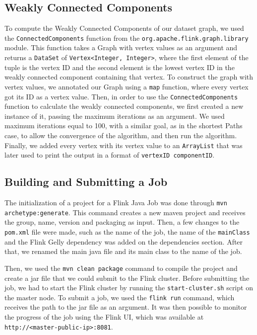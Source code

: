 \documentclass[conference]{IEEEtran}
\begin{document}
\subsection{Weakly Connected Components}

To compute the Weakly Connected Components of our dataset graph, we used the \verb|ConnectedComponents| function from the \verb|org.apache.flink.graph.library| module. This function takes a Graph with vertex values as an argument and returns a \verb|DataSet| of \verb|Vertex<Integer, Integer>|, where the first element of the tuple is the vertex ID and the second element is the lowest vertex ID in the weakly connected component containing that vertex. To construct the graph with vertex values, we annotated our Graph using a \verb|map| function, where every vertex got its ID as a vertex value. Then, in order to use the \verb|ConnectedComponents| function to calculate the weakly connected components, we first created a new instance of it, passing the maximum iterations as an argument. We used maximum iterations equal to 100, with a similar goal, as in the shortest Paths case, to allow the convergence of the algorithm, and then run the algorithm. Finally, we added every vertex with its vertex value to an \verb|ArrayList| that was later used to print the output in a format of \verb|vertexID componentID|.

\subsection{Building and Submitting a Job}

The initialization of a project for a Flink Java Job was done through \verb|mvn archetype:generate|. This command creates a new maven project and receives the group, name, version and packaging as input. Then, a few changes to the \verb|pom.xml| file were made, such as the name of the job, the name of the \verb|mainClass| and the Flink Gelly dependency was added on the dependencies section. After that, we renamed the main java file and its main class to the name of the job.

Then, we used the \verb|mvn clean package| command to compile the project and create a jar file that we could submit to the Flink cluster. Before submitting the job, we had to start the Flink cluster by running the \verb|start-cluster.sh| script on the master node. To submit a job, we used the \verb|flink run| command, which receives the path to the jar file as an argument. It was then possible to monitor the progress of the job using the Flink UI, which was available at \verb|http://<master-public-ip>:8081|.
\end{document}
